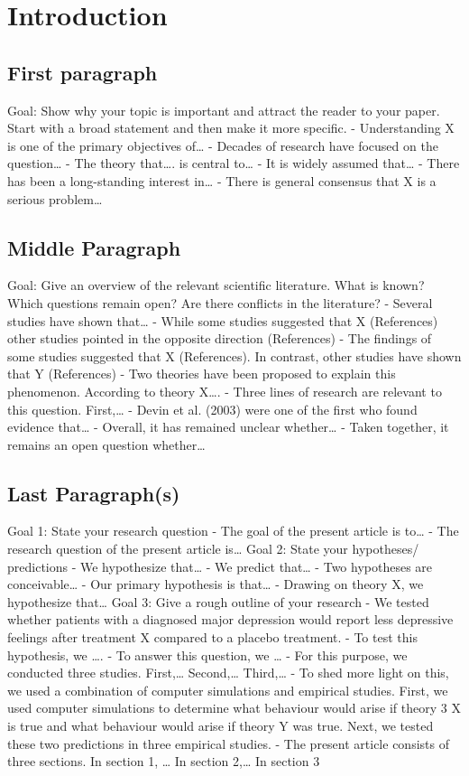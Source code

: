 \chapter{Introduction}

\section{First paragraph}
\label{first-paragraph}

Goal: Show why your topic is important and attract the reader to your paper. Start
with a broad statement and then make it more specific.
- Understanding X is one of the primary objectives of…
- Decades of research have focused on the question…
- The theory that…. is central to…
- It is widely assumed that…
- There has been a long-standing interest in…
- There is general consensus that X is a serious problem…

\section{Middle Paragraph}
\label{middle-paragraph}

Goal: Give an overview of the relevant scientific literature.
What is known? Which questions remain open? Are there conflicts in the literature?
- Several studies have shown that…
- While some studies suggested that X (References) other studies pointed in the opposite
direction (References)
- The findings of some studies suggested that X (References). In contrast, other studies have shown that Y (References)
- Two theories have been proposed to explain this phenomenon. According to theory X….
- Three lines of research are relevant to this question. First,…
- Devin et al. (2003) were one of the first who found evidence that…
- Overall, it has remained unclear whether…
- Taken together, it remains an open question whether…

\section{Last Paragraph(s)}
\label{last-paragraphs}

Goal 1: State your research question
- The goal of the present article is to…
- The research question of the present article is…
Goal 2: State your hypotheses/ predictions
- We hypothesize that…
- We predict that…
- Two hypotheses are conceivable…
- Our primary hypothesis is that…
- Drawing on theory X, we hypothesize that…
Goal 3: Give a rough outline of your research
- We tested whether patients with a diagnosed major depression would report less depressive
feelings after treatment X compared to a placebo treatment.
- To test this hypothesis, we ….
- To answer this question, we …
- For this purpose, we conducted three studies. First,… Second,… Third,…
- To shed more light on this, we used a combination of computer simulations and empirical
studies. First, we used computer simulations to determine what behaviour would arise if theory
3
X is true and what behaviour would arise if theory Y was true. Next, we tested these two
predictions in three empirical studies.
- The present article consists of three sections. In section 1, … In section 2,… In section 3

